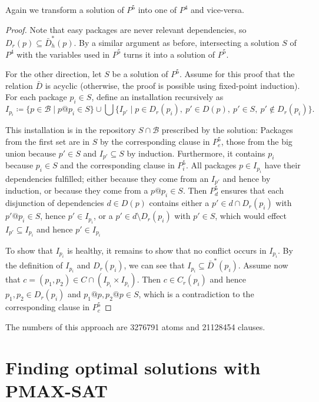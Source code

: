 \documentclass[halfparskip,11pt]{scrartcl}
\begin{document}
Again we transform a solution of $P^5$ into one of $P^4$ and vice-versa.

\begin{proof}
Note that easy packages are never relevant dependencies, so $D_r(p) \subseteq \bar D_h^*(p)$. By a similar argument as before, intersecting a solution $S$ of $P^4$ with the variables used in $P^5$ turns it into a solution of $P^5$.

For the other direction, let $S$ be a solution of $P^5$. Assume for this proof that the relation $\bar D$ is acyclic (otherwise, the proof is possible using fixed-point induction). For each package $p_i\in S$, define an installation recursively as
\[
I_{p_i} \coloneqq \{ p \in \mathcal B \mid p@p_i \in S \} \cup 
\bigcup \{ I_{p'} \mid p\in D_r(p_i),\ p' \in D(p),\ p'\in S,\ p'\notin D_r(p_i)\}.
\]

This installation is in the repository $S\cap \mathcal B$ prescribed by the solution: Packages from the first set are in $S$ by the corresponding clause in $P^5_e$, those from the big union because $p'\in S$ and $I_{p'}\subseteq S$ by induction. Furthermore, it contains $p_i$ because $p_i\in S$ and the corresponding clause in $P^5_i$. All packages $p\in I_{p_i}$ have their dependencies fulfilled; either because they come from an $I_{p'}$ and hence by induction, or because they come from a $p@p_i\in S$. Then $P^5_d$ ensures that each disjunction of dependencies $d\in D(p)$ contains either a $p'\in d\cap D_r(p_i)$ with $p'@p_i\in S$, hence $p'\in I_{p_i}$, or a $p' \in d\setminus D_r(p_i)$ with $p' \in S$, which would effect $I_{p'}\subseteq I_{p_i}$ and hence $p'\in I_{p_i}$

To show that $I_{p_i}$ is healthy, it remains to show that no conflict occurs in $I_{p_i}$. By the definition of $I_{p_i}$ and $D_r(p_i)$, we can see that $I_{p_i} \subseteq \bar D^*(p_i)$. Assume now that $c = (p_1,p_2) \in C\cap (I_{p_i}\times I_{p_i})$. Then $c \in C_r(p_i)$ and hence $p_1,p_2 \in D_r(p_i)$ and $p_1@p, p_2@p \in S$, which is a contradiction to the corresponding clause in $P_c^5$
\end{proof}

The numbers of this approach are 3276791 atoms and 21128454 clauses.

\section{Finding optimal solutions with PMAX-SAT}
\end{document}

